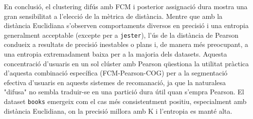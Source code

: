 \documentclass[a4paper,12pt]{report}
\begin{document}
En conclusió, el clustering difús amb FCM i posterior assignació dura mostra una gran sensibilitat a l'elecció de la mètrica de distància. Mentre que amb la distància Euclidiana s'observen comportaments diversos en precisió i una entropia generalment acceptable (excepte per a \texttt{jester}), l'ús de la distància de Pearson condueix a resultats de precisió inestables o plans i, de manera més preocupant, a una entropia extremadament baixa per a la majoria dels datasets. Aquesta concentració d'usuaris en un sol clúster amb Pearson qüestiona la utilitat pràctica d'aquesta combinació específica (FCM-Pearson-COG) per a la segmentació efectiva d'usuaris en aquests sistemes de recomanació, ja que la naturalesa "difusa" no sembla traduir-se en una partició dura útil quan s'empra Pearson. El dataset \texttt{books} emergeix com el cas més consistentment positiu, especialment amb distància Euclidiana, on la precisió millora amb K i l'entropia es manté alta.
\end{document}

